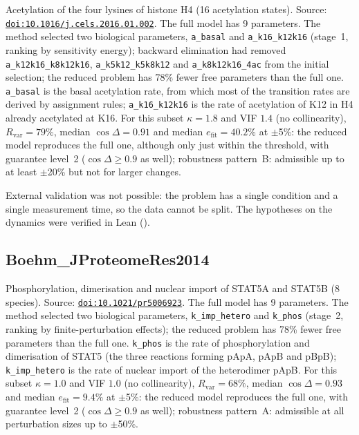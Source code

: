 Acetylation of the four lysines of histone H4 (16 acetylation states). Source: \href{https://doi.org/10.1016/j.cels.2016.01.002}{\nolinkurl{doi:10.1016/j.cels.2016.01.002}}. The full model has 9 parameters. The method selected two biological parameters, \texttt{a\_basal} and \texttt{a\_k16\_k12k16} (stage~1, ranking by sensitivity energy); backward elimination had removed \texttt{a\_k12k16\_k8k12k16}, \texttt{a\_k5k12\_k5k8k12} and \texttt{a\_k8k12k16\_4ac} from the initial selection; the reduced problem has 78\% fewer free parameters than the full one. \texttt{a\_basal} is the basal acetylation rate, from which most of the transition rates are derived by assignment rules; \texttt{a\_k16\_k12k16} is the rate of acetylation of K12 in H4 already acetylated at K16. For this subset $\kappa=1.8$ and VIF $1.4$ (no collinearity), $R_{\mathrm{var}}=79\%$, median $\cos\Delta=0.91$ and median $e_{\mathrm{fit}}=40.2\%$ at $\pm$5\%: the reduced model reproduces the full one, although only just within the threshold, with guarantee level~2 ($\cos\Delta\ge0.9$ as well); robustness pattern~B: admissible up to at least $\pm$20\% but not for larger changes.

External validation was not possible: the problem has a single condition and a single measurement time, so the data cannot be split. The hypotheses on the dynamics were verified in Lean ().

\subsection*{Boehm\_JProteomeRes2014}

Phosphorylation, dimerisation and nuclear import of STAT5A and STAT5B (8 species). Source: \href{https://doi.org/10.1021/pr5006923}{\nolinkurl{doi:10.1021/pr5006923}}. The full model has 9 parameters. The method selected two biological parameters, \texttt{k\_imp\_hetero} and \texttt{k\_phos} (stage~2, ranking by finite-perturbation effects); the reduced problem has 78\% fewer free parameters than the full one. \texttt{k\_phos} is the rate of phosphorylation and dimerisation of STAT5 (the three reactions forming pApA, pApB and pBpB); \texttt{k\_imp\_hetero} is the rate of nuclear import of the heterodimer pApB. For this subset $\kappa=1.0$ and VIF $1.0$ (no collinearity), $R_{\mathrm{var}}=68\%$, median $\cos\Delta=0.93$ and median $e_{\mathrm{fit}}=9.4\%$ at $\pm$5\%: the reduced model reproduces the full one, with guarantee level~2 ($\cos\Delta\ge0.9$ as well); robustness pattern~A: admissible at all perturbation sizes up to $\pm$50\%.

